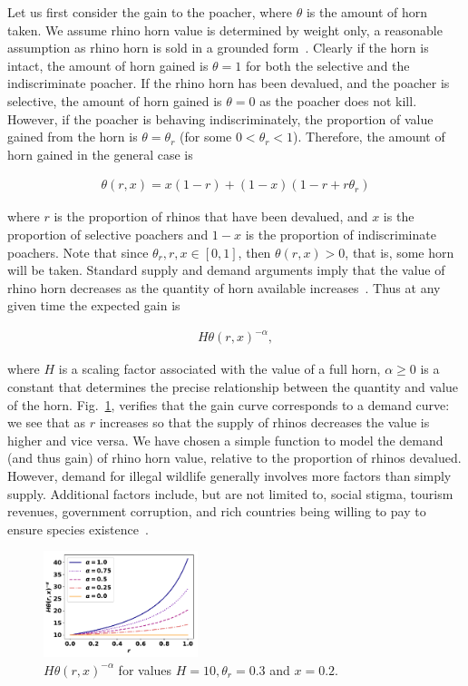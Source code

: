 \documentclass[10pt]{article}
\begin{document}
Let us first consider the gain to the poacher, where \(\theta\) is the amount of
horn taken. We assume rhino horn value is determined by weight only, a
reasonable assumption as rhino horn is sold in a grounded form~\cite{Saverhino}.
Clearly if the horn is intact, the amount of horn gained is \(\theta=1\) for
both the selective and the indiscriminate poacher.  If the rhino horn has been
devalued, and the poacher is selective, the amount of horn gained is
\(\theta=0\) as the poacher does not kill. However, if the poacher is behaving
indiscriminately, the proportion of value gained from the horn is \(\theta =
\theta_r\) (for some \(0<\theta_r<1\)). Therefore, the amount of horn gained in
the general case is

\begin{eqnarray}
    \label{eqn:theta}
    \theta(r, x) = x (1 - r) + (1 - x)(1-r+r\theta_r)
\end{eqnarray}

where \(r\) is the proportion of rhinos that have been devalued, and \(x\) is the
proportion of selective poachers and \(1-x\) is the proportion of indiscriminate
poachers. Note that since \(\theta_r, r, x  \in [0, 1]\), then
\(\theta(r, x) > 0\), that is, some horn will be taken. Standard supply and demand
arguments imply that the value
of rhino horn decreases as the quantity of horn available increases~\cite{mankiw2010}.
Thus at any given time the expected gain is

\begin{eqnarray}
    \label{eqn:individual_gain}
    H \theta(r, x)^{-\alpha},
\end{eqnarray}

where \(H\) is a scaling factor associated with the value of a full horn,
\(\alpha \geq 0\) is a constant that determines the precise relationship between
the quantity and value of the horn.  Fig.~\ref{fig:GainCurve}, verifies that the
gain curve corresponds to a demand curve: we see that as \(r\) increases so that
the supply of rhinos decreases the value is higher and vice versa. We have chosen a simple function to model the demand (and thus gain) of rhino horn value, relative to the proportion of rhinos devalued. However, demand for illegal wildlife generally involves more factors than simply supply. Additional factors include, but are not limited to, social stigma, tourism revenues, government corruption, and rich countries being willing to pay to ensure species existence~\cite{bulte1999economics, van2008protecting}.

\begin{figure}[!htbp]
\centering
\includegraphics[width=0.4\textwidth]{images/gain_curve.pdf}
\caption{\label{fig:GainCurve} \(H \theta(r, x) ^{- \alpha}\) for values
\(H = 10, \theta_r = 0.3\) and \(x = 0.2.\)}
\end{figure}
\end{document}
